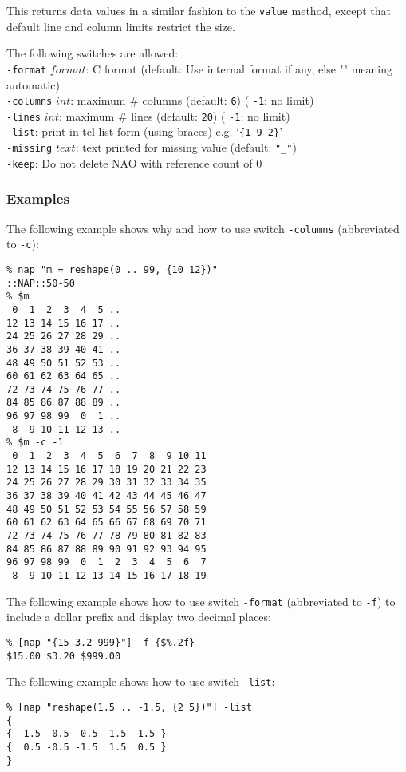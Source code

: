 This returns data values in a similar fashion to the 
  \texttt{value} method, except that default line and column limits
  restrict the size.
  

The following switches are allowed:
  \\
  \texttt{-format} 
  $format$: C format (default: Use internal format if any,
  else "" meaning automatic)
  \\
  \texttt{-columns} 
  $int$: maximum \# columns (default: 
  \texttt{6}) (
  \texttt{-1}: no limit)
  \\
  \texttt{-lines} 
  $int$: maximum \# lines (default: 
  \texttt{20}) (
  \texttt{-1}: no limit)
  \\
  \texttt{-list}: print in tcl list form (using braces) e.g. `\texttt{\{1 9 2\}}'
  \\
  \texttt{-missing} 
  $text$: text printed for missing value (default: 
  \texttt{"\_"})
  \\
  \texttt{-keep}: Do not delete NAO with reference count of 0
  \subsubsection{Examples}
The following example shows why and how to use
  switch 
  \texttt{-columns} (abbreviated to 
  \texttt{-c}):
  \begin{verbatim}
% nap "m = reshape(0 .. 99, {10 12})"
::NAP::50-50
% $m
 0  1  2  3  4  5 ..
12 13 14 15 16 17 ..
24 25 26 27 28 29 ..
36 37 38 39 40 41 ..
48 49 50 51 52 53 ..
60 61 62 63 64 65 ..
72 73 74 75 76 77 ..
84 85 86 87 88 89 ..
96 97 98 99  0  1 ..
 8  9 10 11 12 13 ..
% $m -c -1
 0  1  2  3  4  5  6  7  8  9 10 11
12 13 14 15 16 17 18 19 20 21 22 23
24 25 26 27 28 29 30 31 32 33 34 35
36 37 38 39 40 41 42 43 44 45 46 47
48 49 50 51 52 53 54 55 56 57 58 59
60 61 62 63 64 65 66 67 68 69 70 71
72 73 74 75 76 77 78 79 80 81 82 83
84 85 86 87 88 89 90 91 92 93 94 95
96 97 98 99  0  1  2  3  4  5  6  7
 8  9 10 11 12 13 14 15 16 17 18 19
\end{verbatim}

  

The following example shows how to use switch 
  \texttt{-format} (abbreviated to 
  \texttt{-f}) to include a dollar prefix and display two decimal
  places:
  \begin{verbatim}
% [nap "{15 3.2 999}"] -f {$%.2f}
$15.00 $3.20 $999.00
\end{verbatim}

  

The following example shows how to use switch 
  \texttt{-list}:
  \begin{verbatim}
% [nap "reshape(1.5 .. -1.5, {2 5})"] -list
{
{  1.5  0.5 -0.5 -1.5  1.5 }
{  0.5 -0.5 -1.5  1.5  0.5 }
}
\end{verbatim}

